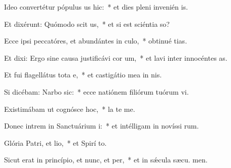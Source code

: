 \item Ideo convertétur pópulus us hic:~* et dies pleni invenién  is.
\item Et dixérunt: Quómodo scit us,~* et si est sciéntia  so?
\item Ecce ipsi peccatóres, et abundántes in culo,~* obtinué tias.
\item Et dixi: Ergo sine causa justificávi cor um,~* et lavi inter innocéntes  as.
\item Et fui flagellátus tota e,~* et castigátio mea in nis.
\item Si dicébam: Narbo sic:~* ecce natiónem filiórum tuórum vi.
\item Existimábam ut cognósce hoc,~* la  te me.
\item Donec intrem in Sanctuárium i:~* et intélligam in novíssi rum.
\item Glória Patri, et lio,~* et Spirí to.
\item Sicut erat in princípio, et nunc, et per,~* et in sǽcula sæcu. men.
